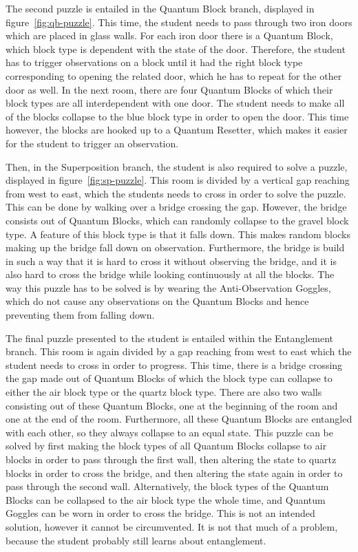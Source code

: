 \documentclass[11pt,twoside]{report} %
\begin{document}
The second puzzle is entailed in the Quantum Block branch, displayed in figure~\ref{fig:qb-puzzle}. This time, the student needs to pass through two iron doors which are placed in glass walls. For each iron door there is a Quantum Block, which block type is dependent with the state of the door. Therefore, the student has to trigger observations on a block until it had the right block type corresponding to opening the related door, which he has to repeat for the other door as well. In the next room, there are four Quantum Blocks of which their block types are all interdependent with one door. The student needs to make all of the blocks collapse to the blue block type in order to open the door. This time however, the blocks are hooked up to a Quantum Resetter, which makes it easier for the student to trigger an observation.

Then, in the Superposition branch, the student is also required to solve a puzzle, displayed in figure~\ref{fig:sp-puzzle}. This room is divided by a vertical gap reaching from west to east, which the students needs to cross in order to solve the puzzle. This can be done by walking over a bridge crossing the gap. However, the bridge consists out of Quantum Blocks, which can randomly collapse to the gravel block type. A feature of this block type is that it falls down. This makes random blocks making up the bridge fall down on observation. Furthermore, the bridge is build in such a way that it is hard to cross it without observing the bridge, and it is also hard to cross the bridge while looking continuously at all the blocks. The way this puzzle has to be solved is by wearing the Anti-Observation Goggles, which do not cause any observations on the Quantum Blocks and hence preventing them from falling down.

The final puzzle presented to the student is entailed within the Entanglement branch. This room is again divided by a gap reaching from west to east which the student needs to cross in order to progress. This time, there is a bridge crossing the gap made out of Quantum Blocks of which the block type can collapse to either the air block type or the quartz block type. There are also two walls consisting out of these Quantum Blocks, one at the beginning of the room and one at the end of the room. Furthermore, all these Quantum Blocks are entangled with each other, so they always collapse to an equal state. This puzzle can be solved by first making the block types of all Quantum Blocks collapse to air blocks in order to pass through the first wall, then altering the state to quartz blocks in order to cross the bridge, and then altering the state again in order to pass through the second wall. Alternatively, the block types of the Quantum Blocks can be collapsed to the air block type the whole time, and Quantum Goggles can be worn in order to cross the bridge. This is not an intended solution, however it cannot be circumvented. It is not that much of a problem, because the student probably still learns about entanglement.
\end{document}
